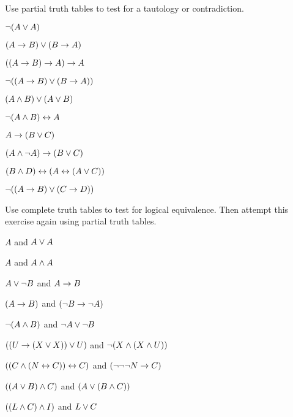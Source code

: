 \documentclass[PHIL101-Textbook.tex]{subfiles}
\begin{document}
\noindent\problempart
\label{pr.TT.TTorC4}
Use partial truth tables to test for a tautology or contradiction. 
\begin{earg}
\item  $\neg (A \vee A)$\vspace{.5ex}      	%
\item $(A \rightarrow B) \vee (B \rightarrow A)$\vspace{.5ex}    	%
\item $((A \rightarrow B) \rightarrow A) \rightarrow A$\vspace{.5ex}    	%
\item $\neg(( A \rightarrow B) \vee (B \rightarrow A))$\vspace{.5ex}  	%
\item $(A \land B) \vee (A \vee B)$\vspace{.5ex}     %
\item $\neg(A\land B) \leftrightarrow A$\vspace{.5ex}     	%
\item $A\rightarrow(B\vee C)$\vspace{.5ex}       	%
\item $(A \land\neg A) \rightarrow (B \vee C)$\vspace{.5ex}   	%
\item $(B\land D) \leftrightarrow (A \leftrightarrow(A \vee C))$\vspace{.5ex}  	%
\item $\neg((A \rightarrow B) \vee (C \rightarrow D))$\vspace{.5ex}   	%
\end{earg}



\noindent\problempart
Use complete truth tables to test for logical equivalence. Then attempt this exercise again using partial truth tables.
\begin{earg}
\item $A$ and $A \vee A$
\item $A$ and $A \land A$
\item $A \vee \neg B$ and $A\rightarrow B$
\item $(A \rightarrow B)$ and $(\neg B \rightarrow \neg A)$
\item $\neg(A \land B)$ and $\neg A \vee \neg B$
\item $ ((U \rightarrow (X \vee X)) \vee U)$ and $\neg (X \land (X \land U))$
\item $ ((C \land (N \leftrightarrow C)) \leftrightarrow C)$ and $(\neg \neg \neg N \rightarrow C)$
\item $((A \vee B) \land C)$ and $(A \vee (B \land C))$
\item $((L \land C) \land I)$ and $L \vee C$
\end{earg}
\end{document}
